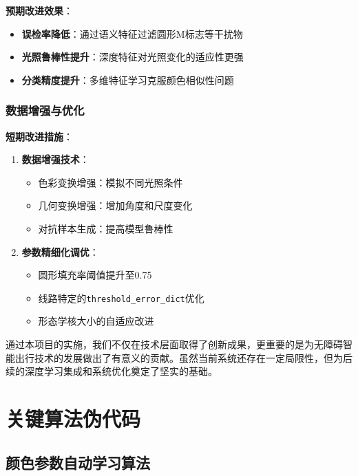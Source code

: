 \documentclass[12pt,a4paper]{article}
\begin{document}
\textbf{预期改进效果}：
\begin{itemize}
    \item \textbf{误检率降低}：通过语义特征过滤圆形M标志等干扰物
    \item \textbf{光照鲁棒性提升}：深度特征对光照变化的适应性更强
    \item \textbf{分类精度提升}：多维特征学习克服颜色相似性问题
\end{itemize}

\subsubsection{数据增强与优化}

\textbf{短期改进措施}：
\begin{enumerate}
    \item \textbf{数据增强技术}：
    \begin{itemize}
        \item 色彩变换增强：模拟不同光照条件
        \item 几何变换增强：增加角度和尺度变化
        \item 对抗样本生成：提高模型鲁棒性
    \end{itemize}

    \item \textbf{参数精细化调优}：
    \begin{itemize}
        \item 圆形填充率阈值提升至0.75
        \item 线路特定的\texttt{threshold\_error\_dict}优化
        \item 形态学核大小的自适应改进
    \end{itemize}
\end{enumerate}

通过本项目的实施，我们不仅在技术层面取得了创新成果，更重要的是为无障碍智能出行技术的发展做出了有意义的贡献。虽然当前系统还存在一定局限性，但为后续的深度学习集成和系统优化奠定了坚实的基础。


\appendix
\section{关键算法伪代码}

\subsection{颜色参数自动学习算法}
\end{document}
